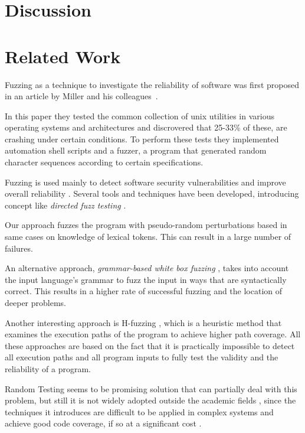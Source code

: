 \documentclass[10pt]{sigplanconf}
\begin{document}
\section{Discussion} %
\label{sec:discussion}

\section{Related Work} %
\label{sec:related}

Fuzzing as a technique to investigate the reliability of software
was first proposed in an article by Miller and his colleagues~\cite{MFS90}.

In this paper they tested the common collection of {\sc unix}
utilities in various operating systems and architectures and discrovered that
25-33\% of these, are crashing under certain conditions. To perform these tests
they implemented automation shell scripts and a fuzzer, a program that generated
random character sequences according to certain specifications.

Fuzzing is used mainly to detect software security vulnerabilities and 
improve overall reliability \cite{TJC08,GODE07}. Several tools and techniques \cite{WWGZ11}
have been developed, introducing concept like \textit{directed fuzz testing} \cite{GLRI09}.

Our approach fuzzes the program with pseudo-random
perturbations based in same cases on knowledge of
lexical tokens. This can result in a large number of failures.

An alternative approach, {\em grammar-based white box fuzzing} \cite{God08},
takes into account the input language's grammar to fuzz the input in
ways that are syntactically correct.
This results in a higher rate of successful fuzzing and the location
of deeper problems.

Another interesting approach is H-fuzzing \cite{ZWZH11}, which is a heuristic method that examines the execution paths
of the program to achieve higher path coverage. All these approaches are based on the fact that it is practically impossible to detect all
execution paths and all program inputs to fully test the validity and the reliability of a program.

Random Testing \cite{HAM06} seems to be promising solution that can partially deal with this problem,
but still it is not widely adopted outside the academic fields \cite{GGBO07}, since the techniques it 
introduces are difficult to be applied in complex systems and achieve good code coverage, if so at a significant cost \cite{RAWO06}.
\end{document}
